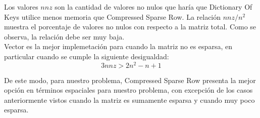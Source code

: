 Los valores $nnz$ son la cantidad de valores no nulos que haría que Dictionary Of Keys utilice menos memoria que Compressed Sparse Row. La relación $nnz/n^2$ muestra el porcentaje de valores no nulos con respecto a la matriz total. Como se observa, la relación debe ser muy baja.\\

Vector es la mejor implemetación para cuando la matriz no es esparsa, en particular cuando se cumple la siguiente desigualdad: $$3 nnz > 2n^2 - n + 1$$

De este modo, para nuestro problema, Compressed Sparse Row presenta la mejor opción en términos espaciales para nuestro problema, con excepción de los casos anteriormente vistos cuando la matriz es sumamente esparsa y cuando muy poco esparsa.